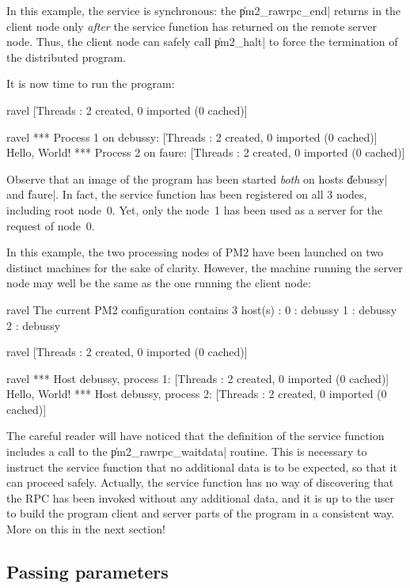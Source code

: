 In this example, the service is synchronous: the \|pm2_rawrpc_end|
returns in the client node only \emph{after} the service function has
returned on the remote server node. Thus, the client node can safely
call \|pm2_halt| to force the termination of the distributed program.

It is now time to run the program:
\begin{shell}
ravel%
[Threads : 2 created, 0 imported (0 cached)]

ravel%
*** Process 1 on debussy:
[Threads : 2 created, 0 imported (0 cached)]
Hello, World!
*** Process 2 on faure:
[Threads : 2 created, 0 imported (0 cached)]
\end{shell}
Observe that an image of the program has been started \emph{both} on
hosts \|debussy| and \|faure|. In fact, the service function has been
registered on all 3 nodes, including root node~0.  Yet, only the
node~1 has been used as a server for the request of node~0.

In this example, the two processing nodes of PM2 have been launched on
two distinct machines for the sake of clarity.  However, the machine
running the server node may well be the same as the one running the
client node:
\begin{shell}
ravel%
The current PM2 configuration contains 3 host(s) :
0 : debussy
1 : debussy
2 : debussy

ravel%
[Threads : 2 created, 0 imported (0 cached)]

ravel%
*** Host debussy, process 1:
[Threads : 2 created, 0 imported (0 cached)]
Hello, World!
*** Host debussy, process 2:
[Threads : 2 created, 0 imported (0 cached)]
\end{shell}

The careful reader will have noticed that the definition of the
service function includes a call to the \|pm2_rawrpc_waitdata|
routine. This is necessary to instruct the service function that no
additional data is to be expected, so that it can proceed safely.
Actually, the service function has no way of discovering that the RPC
has been invoked without any additional data, and it is up to the user
to build the program client and server parts of the program in a
consistent way. More on this in the next section!

\subsection{Passing parameters}

